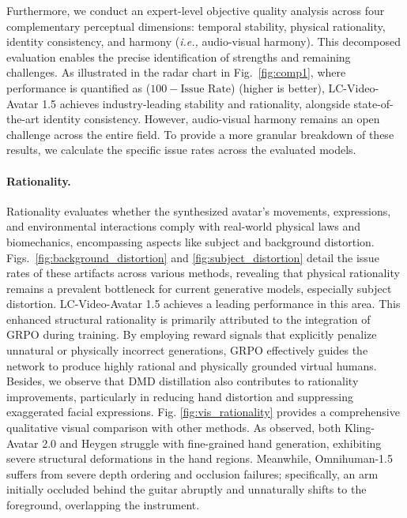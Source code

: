 Furthermore, we conduct an expert-level objective quality analysis across four complementary perceptual dimensions: temporal stability, physical rationality, identity consistency, and harmony (\textit{i.e.,} audio-visual harmony). This decomposed evaluation enables the precise identification of strengths and remaining challenges. As illustrated in the radar chart in Fig.~\ref{fig:comp1}, where performance is quantified as ($100 - \text{Issue Rate}$) (higher is better), LC-Video-Avatar 1.5 achieves industry-leading stability and rationality, alongside state-of-the-art identity consistency. However, audio-visual harmony remains an open challenge across the entire field. To provide a more granular breakdown of these results, we calculate the specific issue rates across the evaluated models. 








\paragraph{Rationality.}
Rationality evaluates whether the synthesized avatar's movements, expressions, and environmental interactions comply with real-world physical laws and biomechanics, encompassing aspects like subject and background distortion. Figs.~\ref{fig:background_distortion} and \ref{fig:subject_distortion} detail the issue rates of these artifacts across various methods, revealing that physical rationality remains a prevalent bottleneck for current generative models, especially subject distortion. LC-Video-Avatar 1.5 achieves a leading performance in this area. This enhanced structural rationality is primarily attributed to the integration of GRPO during training. By employing reward signals that explicitly penalize unnatural or physically incorrect generations, GRPO effectively guides the network to produce highly rational and physically grounded virtual humans. 
Besides, we observe that DMD distillation also contributes to rationality improvements, particularly in reducing hand distortion and suppressing exaggerated facial expressions.
Fig. \ref{fig:vis_rationality} provides a comprehensive qualitative visual comparison with other methods. As observed, both Kling-Avatar 2.0 and Heygen struggle with fine-grained hand generation, exhibiting severe structural deformations in the hand regions. Meanwhile, Omnihuman-1.5 suffers from severe depth ordering and occlusion failures; specifically, an arm initially occluded behind the guitar abruptly and unnaturally shifts to the foreground, overlapping the instrument.




